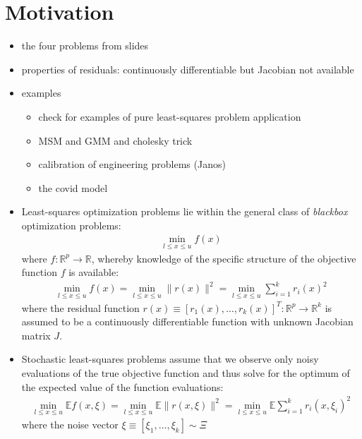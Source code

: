 
\section{Motivation}
\label{sec:motivationcd}

\begin{itemize}
    \item the four problems from slides
    \item properties of residuals: continuously differentiable but Jacobian not available
    \item examples
        \begin{itemize}
            \item check for examples of pure least-squares problem application
            \item MSM and GMM and cholesky trick
            \item calibration of engineering problems (Janos)
            \item the covid model
        \end{itemize}
\end{itemize}


\begin{itemize}
    \item Least-squares optimization problems lie within the general class of \textit{blackbox} optimization problems:
        \begin{align}
            \min\limits_{l\leq x\leq u}f(x)
            \label{eq:problem-scalar-det}
        \end{align}
    where $f:\mathbb{R}^p\rightarrow\mathbb{R}$, whereby knowledge of the specific structure of the objective function $f$ is available:
        \begin{align}
            \min\limits_{l\leq x\leq u}f(x)=\min\limits_{l\leq x\leq u}\lVert r(x)\rVert^2=\min\limits_{l\leq x\leq u}\sum\limits_{i=1}^kr_i(x)^2
            \label{eq:problem-vec-det}
        \end{align}
    where the residual function $r(x)\equiv[r_1(x),\dots,r_k(x)]^T:\mathbb{R}^p\rightarrow\mathbb{R}^k$ is assumed to be a continuously differentiable function with unknown Jacobian matrix $J$.
    \item Stochastic least-squares problems assume that we observe only noisy evaluations of the true objective function and thus solve for the optimum of the expected value of the function evaluations:
        \begin{align}
            \min\limits_{l\leq x\leq u}\mathbb{E}f(x,\xi)=\min\limits_{l\leq x\leq u}\mathbb{E}\lVert r(x,\xi)\rVert^2=\min\limits_{l\leq x\leq u}\mathbb{E}\sum\limits_{i=1}^kr_i(x, \xi_i)^2
            \label{eq:problem-vec-noise}
        \end{align}
    where the noise vector $\xi\equiv[\xi_1,\dots,\xi_k]\sim\Xi$
\end{itemize}

